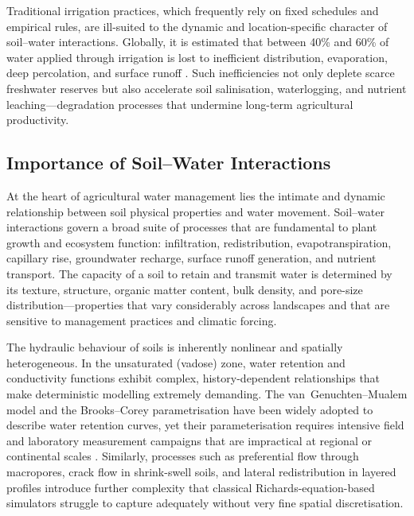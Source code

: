 \documentclass[land,article,submit,pdftex,moreauthors]{Definitions/mdpi}
\numberwithin{equation}{section}
\begin{document}
Traditional irrigation practices, which frequently rely on fixed schedules and empirical rules, are ill-suited to the dynamic and location-specific character of soil--water interactions. Globally, it is estimated that between 40\% and 60\% of water applied through irrigation is lost to inefficient distribution, evaporation, deep percolation, and surface runoff \citep{galland2025climate}. Such inefficiencies not only deplete scarce freshwater reserves but also accelerate soil salinisation, waterlogging, and nutrient leaching---degradation processes that undermine long-term agricultural productivity.

\subsection{Importance of Soil--Water Interactions}

At the heart of agricultural water management lies the intimate and dynamic relationship between soil physical properties and water movement. Soil--water interactions govern a broad suite of processes that are fundamental to plant growth and ecosystem function: infiltration, redistribution, evapotranspiration, capillary rise, groundwater recharge, surface runoff generation, and nutrient transport. The capacity of a soil to retain and transmit water is determined by its texture, structure, organic matter content, bulk density, and pore-size distribution---properties that vary considerably across landscapes and that are sensitive to management practices and climatic forcing.

The hydraulic behaviour of soils is inherently nonlinear and spatially heterogeneous. In the unsaturated (vadose) zone, water retention and conductivity functions exhibit complex, history-dependent relationships that make deterministic modelling extremely demanding. The van~Genuchten--Mualem model and the Brooks--Corey parametrisation have been widely adopted to describe water retention curves, yet their parameterisation requires intensive field and laboratory measurement campaigns that are impractical at regional or continental scales \citep{vangenuchten1980closed}. Similarly, processes such as preferential flow through macropores, crack flow in shrink-swell soils, and lateral redistribution in layered profiles introduce further complexity that classical Richards-equation-based simulators struggle to capture adequately without very fine spatial discretisation.
\end{document}
